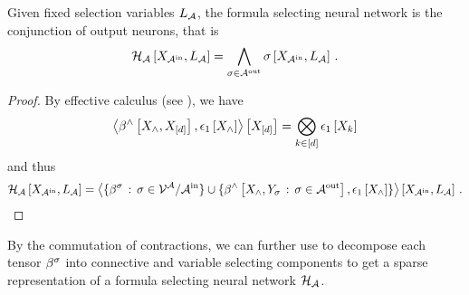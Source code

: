 \begin{theorem}
	Given fixed selection variables $L_{\mathcal{A}}$, the formula selecting neural network is the conjunction of output neurons, that is
	\begin{align*}
		\mathcal{H}_{\mathcal{A}}\left[X_{\mathcal{A}^{\mathrm{in}}},L_{\mathcal{A}}\right] = \bigwedge_{\sigma\in\mathcal{A}^{\mathrm{out}}} \sigma\left[X_{\mathcal{A}^{\mathrm{in}}},L_{\mathcal{A}}\right] \, . 
	\end{align*}
\end{theorem}
\begin{proof}
	By effective calculus (see ), we have
		\[ \left\langle \beta^{\land}\left[X_{\land},X_{[d]}\right],\epsilon_{1}\left[X_{\land}\right]\right\rangle \left[ X_{[d]} \right] = \bigotimes_{k\in[d]} \epsilon_{1}\left[X_{k}\right] \]
	and thus
	\begin{align*}
		\mathcal{H}_{\mathcal{A}}\left[X_{\mathcal{A}^{\mathrm{in}}},L_{\mathcal{A}}\right]
		= \left\langle 
			\{\beta^{\sigma} \, : \, \sigma\in\mathcal{V}^{\mathcal{A}}/\mathcal{A}^{\mathrm{in}} \} \cup \{\beta^{\land}\left[X_{\land},Y_{\sigma}  \, : \, \sigma\in\mathcal{A}^{\mathrm{out}}\right], \epsilon_{1}\left[X_{\land}\right]\}
		\right\rangle \left[ X_{\mathcal{A}^{\mathrm{in}}},L_{\mathcal{A}} \right] \, . 
	\end{align*}
\end{proof}


By the commutation of contractions, we can further use  to decompose each tensor $\beta^{\sigma}$ into connective and variable selecting components to get a sparse representation of a formula selecting neural network $\mathcal{H}_{\mathcal{A}}$.


